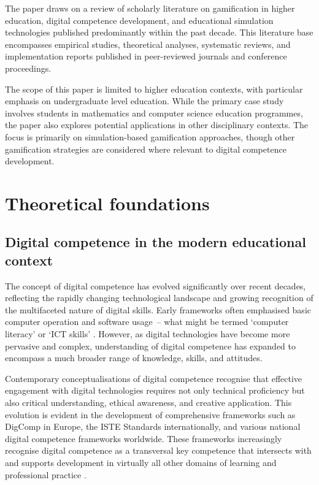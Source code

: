 \documentclass[cte]{acnsart}
\begin{document}
The paper draws on a review of scholarly literature on gamification in higher education, digital competence development, and educational simulation technologies published predominantly within the past decade. This literature base encompasses empirical studies, theoretical analyses, systematic reviews, and implementation reports published in peer-reviewed journals and conference proceedings.

The scope of this paper is limited to higher education contexts, with particular emphasis on undergraduate level education. While the primary case study involves students in mathematics and computer science education programmes, the paper also explores potential applications in other disciplinary contexts. The focus is primarily on simulation-based gamification approaches, though other gamification strategies are considered where relevant to digital competence development.

\section{Theoretical foundations}

\subsection{Digital competence in the modern educational context}


The concept of digital competence has evolved significantly over recent decades, reflecting the rapidly changing technological landscape and growing recognition of the multifaceted nature of digital skills. Early frameworks often emphasised basic computer operation and software usage~-- what might be termed `computer literacy' or `ICT skills' \cite{Siiman2017148}. However, as digital technologies have become more pervasive and complex, understanding of digital competence has expanded to encompass a much broader range of knowledge, skills, and attitudes.

Contemporary conceptualisations of digital competence recognise that effective engagement with digital technologies requires not only technical proficiency but also critical understanding, ethical awareness, and creative application. This evolution is evident in the development of comprehensive frameworks such as DigComp in Europe, the ISTE Standards internationally, and various national digital competence frameworks worldwide. These frameworks increasingly recognise digital competence as a transversal key competence that intersects with and supports development in virtually all other domains of learning and professional practice \cite{Barboutidis2023613}.
\end{document}
